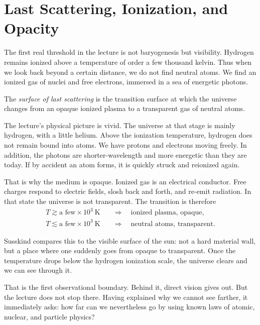 \section{Last Scattering, Ionization, and Opacity}

The first real threshold in the lecture is not baryogenesis but visibility. Hydrogen remains ionized above a temperature of order a few thousand kelvin. Thus when we look back beyond a certain distance, we do not find neutral atoms. We find an ionized gas of nuclei and free electrons, immersed in a sea of energetic photons.

\begin{definition}
The \emph{surface of last scattering} is the transition surface at which the universe changes from an opaque ionized plasma to a transparent gas of neutral atoms.
\end{definition}

The lecture's physical picture is vivid. The universe at that stage is mainly hydrogen, with a little helium. Above the ionization temperature, hydrogen does not remain bound into atoms. We have protons and electrons moving freely. In addition, the photons are shorter-wavelength and more energetic than they are today. If by accident an atom forms, it is quickly struck and reionized again.

That is why the medium is opaque. Ionized gas is an electrical conductor. Free charges respond to electric fields, slosh back and forth, and re-emit radiation. In that state the universe is not transparent. The transition is therefore
\begin{align}
T \gtrsim \text{a few}\times 10^3\ \mathrm{K}
&\quad \Longrightarrow \quad
\text{ionized plasma, opaque},
\\[4pt]
T \lesssim \text{a few}\times 10^3\ \mathrm{K}
&\quad \Longrightarrow \quad
\text{neutral atoms, transparent}.
\end{align}

Susskind compares this to the visible surface of the sun: not a hard material wall, but a place where one suddenly goes from opaque to transparent. Once the temperature drops below the hydrogen ionization scale, the universe clears and we can see through it.

That is the first observational boundary. Behind it, direct vision gives out. But the lecture does not stop there. Having explained why we cannot see farther, it immediately asks: how far can we nevertheless go by using known laws of atomic, nuclear, and particle physics?

